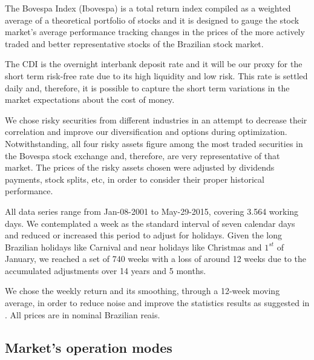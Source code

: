 The Bovespa Index (Ibovespa) is a total return index compiled as a weighted average of a theoretical portfolio of stocks and it is designed to gauge the stock market's average performance tracking changes in the prices of the more actively traded and better representative stocks of the Brazilian stock market.


The CDI is the overnight interbank deposit rate and it will be our proxy for the short term risk-free rate due to its high liquidity and low risk.
This rate is settled daily and, therefore, it is possible to capture the short term variations in the market expectations about the cost of money.

We chose risky securities from different industries in an attempt to decrease their correlation and improve our diversification and options during optimization.
Notwithstanding, all four risky assets figure among the most traded securities in the Bovespa stock exchange and, therefore, are very representative of that market.
The prices of the risky assets chosen were adjusted by dividends payments, stock splits, etc, in order to consider their proper historical performance.

All data series range from Jan-08-2001 to May-29-2015, covering 3.564 working days.
We contemplated a week as the standard interval of seven calendar days and reduced or increased this period to adjust for holidays.
Given the long Brazilian holidays like Carnival and near holidays like Christmas and $1^{st}$ of January, we reached a set of 740 weeks with a loss of around 12 weeks due to the accumulated adjustments over 14 years and 5 months.

We chose the weekly return and its smoothing, through a 12-week moving average, in order to reduce noise and improve the statistics results as suggested in \cite{valuation}.
All prices are in nominal Brazilian reais.


\subsection{Market's operation modes} \label{ss2}

